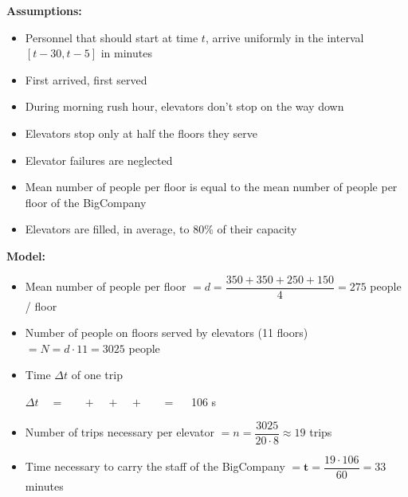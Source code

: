 \textbf{Assumptions:}
\begin{itemize}
	\item Personnel that should start at time $t$, arrive uniformly in the interval $[t-30, t-5]$ in minutes
	\item First arrived, first served
	\item During morning rush hour, elevators don't stop on the way down
	\item Elevators stop only at half the floors they serve
	\item Elevator failures are neglected
	\item Mean number of people per floor is equal to the mean number of people per floor of the BigCompany
	\item Elevators are filled, in average, to 80\% of their capacity
\end{itemize}


\textbf{Model:}
\begin{itemize}
	\item Mean number of people per floor $= d = \dfrac{350+350+250+150}{4} = 275$ people / floor
	\item Number of people on floors served by elevators (11 floors) $= N = d \cdot 11 = 3025$ people
	\item Time $\Delta t$ of one trip

\hfil $\Delta t \quad = \quad $  
		$ \;+ \;$ 
		$ \;+\; $ 
		$\;+\; $  $\quad = \quad$ 106 s
		
		\item Number of trips necessary per elevator $= n = \dfrac{3025}{20 \cdot 8} \approx 19$ trips

		\item Time necessary to carry the staff of the BigCompany $= \pmb{t} = \dfrac{19 \cdot 106}{60} = 33 $ minutes
\end{itemize}

\hfill \\

